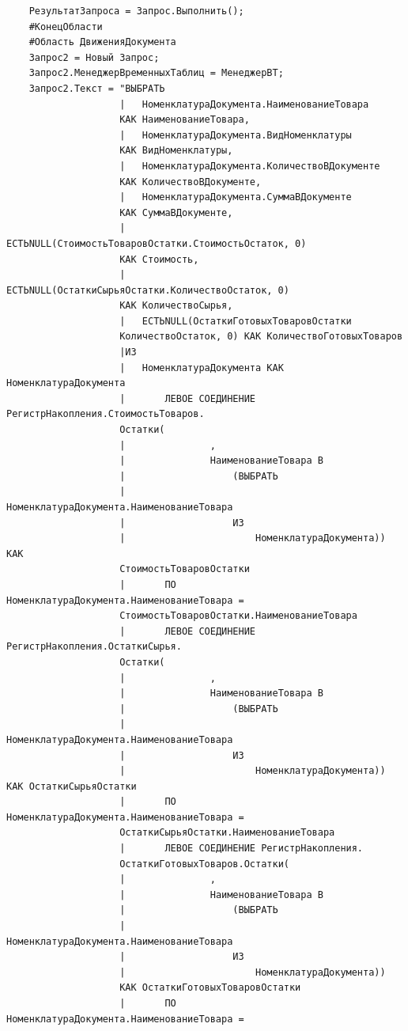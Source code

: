 \documentclass[12pt,a4paper]{article}
\begin{document}
\begin{appendices}
\begin{verbatim}
    РезультатЗапроса = Запрос.Выполнить();
    #КонецОбласти
    #Область ДвиженияДокумента
    Запрос2 = Новый Запрос;
    Запрос2.МенеджерВременныхТаблиц = МенеджерВТ;
    Запрос2.Текст = "ВЫБРАТЬ
                    |	НоменклатураДокумента.НаименованиеТовара
                    КАК НаименованиеТовара,
                    |	НоменклатураДокумента.ВидНоменклатуры
                    КАК ВидНоменклатуры,
                    |	НоменклатураДокумента.КоличествоВДокументе
                    КАК КоличествоВДокументе,
                    |	НоменклатураДокумента.СуммаВДокументе
                    КАК СуммаВДокументе,
                    |	ЕСТЬNULL(СтоимостьТоваровОстатки.СтоимостьОстаток, 0)
                    КАК Стоимость,
                    |	ЕСТЬNULL(ОстаткиСырьяОстатки.КоличествоОстаток, 0)
                    КАК КоличествоСырья,
                    |	ЕСТЬNULL(ОстаткиГотовыхТоваровОстатки
                    КоличествоОстаток, 0) КАК КоличествоГотовыхТоваров
                    |ИЗ
                    |	НоменклатураДокумента КАК НоменклатураДокумента
                    |		ЛЕВОЕ СОЕДИНЕНИЕ РегистрНакопления.СтоимостьТоваров.
                    Остатки(
                    |				,
                    |				НаименованиеТовара В
                    |					(ВЫБРАТЬ
                    |						НоменклатураДокумента.НаименованиеТовара
                    |					ИЗ
                    |						НоменклатураДокумента)) КАК
                    СтоимостьТоваровОстатки
                    |		ПО НоменклатураДокумента.НаименованиеТовара =
                    СтоимостьТоваровОстатки.НаименованиеТовара
                    |		ЛЕВОЕ СОЕДИНЕНИЕ РегистрНакопления.ОстаткиСырья.
                    Остатки(
                    |				,
                    |				НаименованиеТовара В
                    |					(ВЫБРАТЬ
                    |						НоменклатураДокумента.НаименованиеТовара
                    |					ИЗ
                    |						НоменклатураДокумента)) КАК ОстаткиСырьяОстатки
                    |		ПО НоменклатураДокумента.НаименованиеТовара =
                    ОстаткиСырьяОстатки.НаименованиеТовара
                    |		ЛЕВОЕ СОЕДИНЕНИЕ РегистрНакопления.
                    ОстаткиГотовыхТоваров.Остатки(
                    |				,
                    |				НаименованиеТовара В
                    |					(ВЫБРАТЬ
                    |						НоменклатураДокумента.НаименованиеТовара
                    |					ИЗ
                    |						НоменклатураДокумента))
                    КАК ОстаткиГотовыхТоваровОстатки
                    |		ПО НоменклатураДокумента.НаименованиеТовара =

\end{verbatim}
\end{appendices}
\end{document}
